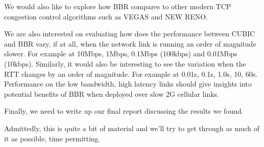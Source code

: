 We would also like to explore how BBR compares to other modern TCP congestion control algorithms
such as VEGAS and NEW RENO.

We are also interested on evaluating how does the performance between CUBIC and BBR vary, if at all, when the network
link is running an order of magnitude slower. For example at 10Mbps, 1Mbps, 0.1Mbps (100kbps) and 0.01Mbps (10kbps).
Similarly, it would also be interesting to see the variation when the RTT changes by an order of magnitude. For example
at 0.01s, 0.1s, 1.0s, 10, 60s. Performance on the low bandwidth, high latency links should give insights into
potential benefits of BBR when deployed over slow 2G cellular links.

Finally, we need to write up our final report discussing the results we found.

Admittedly, this is  quite a bit of material and we'll try to get through as much of it as possible, time permitting.

